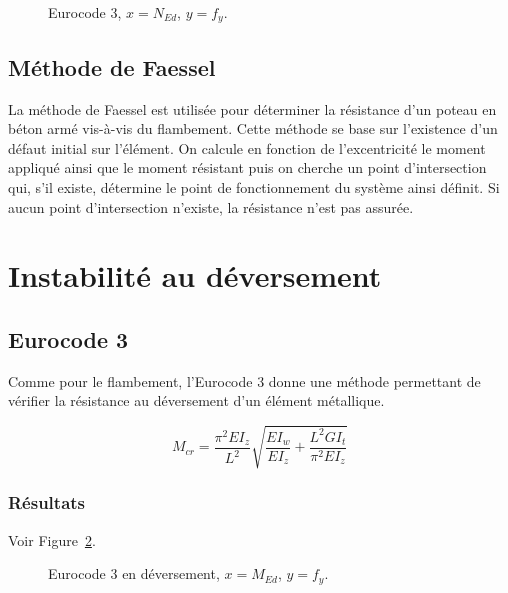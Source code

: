 \documentclass{report}
\begin{document}
\begin{figure}[!ht]
    \centering
    
    \caption{Eurocode 3, $x=N_{Ed}$, $y=f_y$.}\label{fig:res2}
\end{figure}

\subsection{Méthode de Faessel}

La méthode de Faessel est utilisée pour déterminer la résistance d'un poteau en béton armé vis-à-vis du flambement. Cette méthode se base sur l'existence d'un défaut initial sur l'élément. On calcule en fonction de l'excentricité le moment appliqué ainsi que le moment résistant puis on cherche un point d'intersection qui, s'il existe, détermine le point de fonctionnement du système ainsi définit. Si aucun point d'intersection n'existe, la résistance n'est pas assurée.

\section{Instabilité au déversement}
\subsection{Eurocode 3}
Comme pour le flambement, l'Eurocode 3 donne une méthode permettant de vérifier la résistance au déversement d'un élément métallique.

\begin{dmath}
    M_{cr}=\frac{\pi^2 EI_z}{L^2}\sqrt{\frac{EI_w}{EI_z}+\frac{L^2GI_t}{\pi^2EI_z}}
\end{dmath}

\subsubsection{Résultats}
Voir Figure~\ref{fig:m1}.

\begin{figure}[!ht]
    \centering
    
    \caption{Eurocode 3 en déversement, $x=M_{Ed}$, $y=f_y$.}\label{fig:m1}
\end{figure}

\listoffigures

\nocite{*}
\printbibliography
\end{document}
